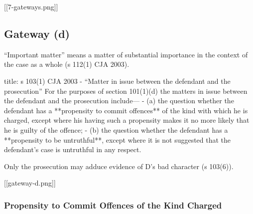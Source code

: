 \documentclass[
]{article}
\newenvironment{Shaded}{}{}
\newcommand{\NormalTok}[1]{#1}
\begin{document}
{[}{[}7-gateways.png{]}{]}

\hypertarget{gateway-d}{%
\subsection{Gateway (d)}\label{gateway-d}}

``Important matter'' means a matter of substantial importance in the
context of the case as a whole (s 112(1) CJA 2003).

\begin{Shaded}
\begin{Highlighting}[]
\NormalTok{title: s 103(1) CJA 2003 {-} “Matter in issue between the defendant and the prosecution”}
\NormalTok{For the purposes of section 101(1)(d) the matters in issue between the defendant and the prosecution include—}
\NormalTok{{-} (a) the question whether the defendant has a **propensity to commit offences** of the kind with which he is charged, except where his having such a propensity makes it no more likely that he is guilty of the offence;}
\NormalTok{{-} (b) the question whether the defendant has a **propensity to be untruthful**, except where it is not suggested that the defendant’s case is untruthful in any respect.}
\end{Highlighting}
\end{Shaded}

Only the prosecution may adduce evidence of D's bad character (s
103(6)).

{[}{[}gateway-d.png{]}{]}

\hypertarget{propensity-to-commit-offences-of-the-kind-charged}{%
\subsubsection{Propensity to Commit Offences of the Kind
Charged}\label{propensity-to-commit-offences-of-the-kind-charged}}
\end{document}
